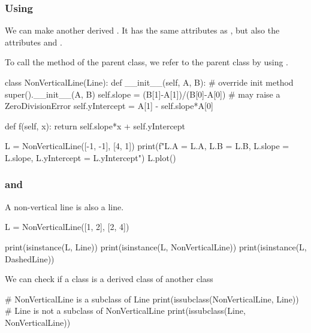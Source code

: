 \documentclass[hyperref={pdfpagelabels=false},table]{beamer}
\begin{document}
\begin{frame}[fragile]\frametitle{Using }

  We can make another derived . 
  It has the same attributes as , 
  but also the attributes  and .

  To call the  method of the parent class, 
  we refer to the parent class by using .

\begin{python}
class NonVerticalLine(Line):
    def __init__(self, A, B): # override init method
        super().__init__(A, B)
        self.slope = (B[1]-A[1])/(B[0]-A[0]) # may raise a ZeroDivisionError
        self.yIntercept = A[1] - self.slope*A[0]

    def f(self, x):
        return self.slope*x + self.yIntercept

L = NonVerticalLine([-1, -1], [4, 1])
print(f"L.A = {L.A}, L.B = {L.B}, L.slope = {L.slope}, L.yIntercept = {L.yIntercept}")
L.plot()
\end{python}

\end{frame}

\begin{frame}[fragile]\frametitle{ and }

A non-vertical line is also a line.

\begin{python}
L = NonVerticalLine([1, 2], [2, 4])

print(isinstance(L, Line))
print(isinstance(L, NonVerticalLine))
print(isinstance(L, DashedLine))
\end{python}

\pause 

We can check if a class is a derived class of another class

\begin{python}
# NonVerticalLine is a subclass of Line
print(issubclass(NonVerticalLine, Line))  
# Line is not a subclass of NonVerticalLine
print(issubclass(Line, NonVerticalLine)) 
\end{python}

\end{frame}
\end{document}
